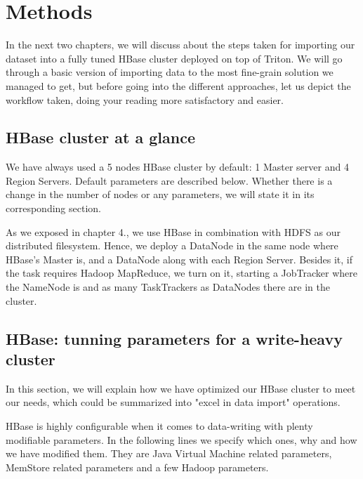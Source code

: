 \chapter{Methods}
\label{chapter:methods}



In the next two chapters, we will discuss about the steps taken for importing our dataset into a fully tuned HBase cluster deployed on top of Triton. We will go through a basic version of importing data to the most fine-grain solution we managed to get, but before going into the different approaches, let us depict the workflow taken, doing your reading more satisfactory and easier.

\bigskip
\centerline{}
\bigskip



\section{HBase cluster at a glance}

We have always used a 5 nodes HBase cluster by default: 1 Master server and 4 Region Servers. Default parameters are described below. Whether there is a change in the number of nodes or any parameters, we will state it in its corresponding section.
\par
As we exposed in chapter 4., we use HBase in combination with HDFS as our distributed filesystem. Hence, we deploy a DataNode in the same node where HBase's Master is, and a DataNode along with each Region Server. Besides it, if the task requires Hadoop MapReduce, we turn on it, starting a JobTracker where the NameNode is and as many TaskTrackers as DataNodes there are in the cluster.

\section{HBase: tunning parameters for a write-heavy cluster}

In this section, we will explain how we have optimized our HBase cluster to meet our needs, which could be summarized into "excel in data import" operations.
\par
HBase is highly configurable when it comes to data-writing with plenty modifiable parameters. In the following lines we specify which ones, why and how we have modified them. They are Java Virtual Machine related parameters, MemStore related parameters and a few Hadoop parameters.

